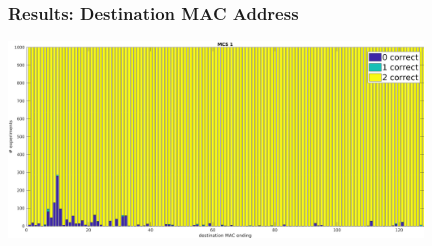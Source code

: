 \documentclass[accentcolor=tud8b,colorbacktitle]{tudbeamer}
\begin{document}
\begin{frame}
\frametitle{Results: Destination MAC Address}
\begin{centering}
	\includegraphics[width=11cm]{../../gfx/plots/destination}\\
\end{centering}
\end{frame}
\end{document}
